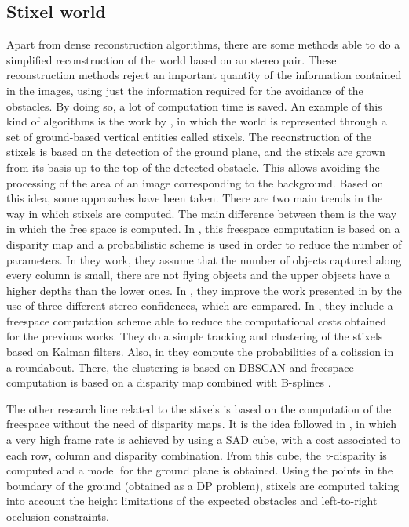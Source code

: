 \subsection{Stixel world}\label{ch:chapter00_02_04}

Apart from dense reconstruction algorithms, there are some methods able to do a simplified reconstruction of the world based on an stereo pair. These reconstruction methods reject an important quantity of the information contained in the images, using just the information required for the avoidance of the obstacles. By doing so, a lot of computation time is saved. An example of this kind of algorithms is the work by \cite{badino2009stixel}, in which the world is represented through a set of ground-based vertical entities called stixels. The reconstruction of the stixels is based on the detection of the ground plane, and the stixels are grown from its basis up to the top of the detected obstacle. This allows avoiding the processing of the area of an image corresponding to the background. 
Based on this idea, some approaches have been taken. There are two main trends in the way in which stixels are computed. The main difference between them is the way in which the free space is computed. In \cite{pfeiffer2011towards, pfeiffer2013exploiting, pfeiffer2010efficient, muffert2012may}, this freespace computation is based on a disparity map and a probabilistic scheme is used in order to reduce the number of parameters. In they work, they assume that the number of objects captured along every column is small, there are not flying objects and the upper objects have a higher depths than the lower ones. In \cite{pfeiffer2013exploiting}, they improve the work presented in \cite{pfeiffer2011towards} by the use of three different stereo confidences, which are compared. In \cite{pfeiffer2010efficient}, they include a freespace computation scheme able to reduce the computational costs obtained for the previous works. They do a simple tracking and clustering of the stixels based on Kalman filters. Also, in \cite{muffert2012may} they compute the probabilities of a colission in a roundabout. There, the clustering is based on DBSCAN \citep{ester1996density} and freespace computation is based on a disparity map combined with B-splines \citep{wedel2009bspline}. 

The other research line related to the stixels is based on the computation of the freespace without the need of disparity maps. It is the idea followed in \cite{benenson2011stixels, benenson2012pedestrian, benenson2012fast, gunyel2012stixels}, in which a very high frame rate is achieved by using a \ac{SAD} cube, with a cost associated to each row, column and disparity combination. From this cube, the \emph{v}-disparity is computed and a model for the ground plane is obtained. Using the points in the boundary of the ground (obtained as a \ac{DP} problem), stixels are computed taking into account the height limitations of the expected obstacles and left-to-right occlusion constraints. 

